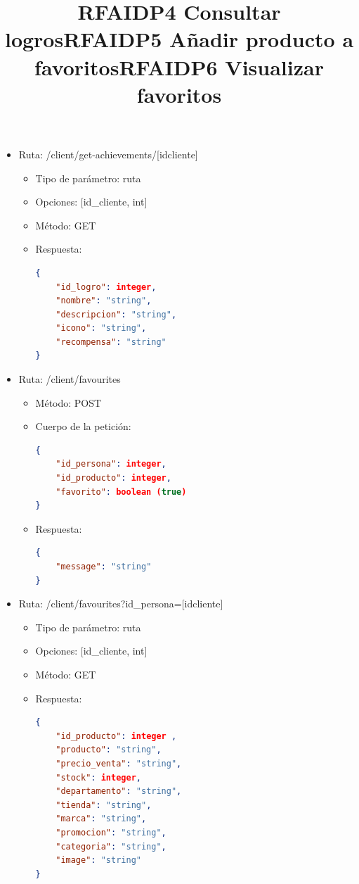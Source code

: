 \title{\textbf{RFAIDP4 Consultar logros}}
\begin{itemize}
\item Ruta: /client/get-achievements/[idcliente]
\begin{itemize}
\item Tipo de parámetro: ruta
\item Opciones: [id\_cliente, int]
\item Método: GET
\item Respuesta:
\begin{lstlisting}[language=json,firstnumber=1]
{
	"id_logro": integer, 
	"nombre": "string",
	"descripcion": "string",
	"icono": "string",
	"recompensa": "string"
}
\end{lstlisting}
\end{itemize}
\end{itemize}
\title{\textbf{RFAIDP5 Añadir producto a favoritos}}
\begin{itemize}
\item Ruta: /client/favourites
\begin{itemize}
\item Método: POST
\item Cuerpo de la petición:
\begin{lstlisting}[language=json,firstnumber=1]
{
	"id_persona": integer, 
	"id_producto": integer,
	"favorito": boolean (true)
}
\end{lstlisting}
\item Respuesta: 
\begin{lstlisting}[language=json,firstnumber=1]
{
    "message": "string"
}
\end{lstlisting}
\end{itemize}
\end{itemize}
\title{\textbf{RFAIDP6 Visualizar favoritos}}
\begin{itemize}
\item Ruta: /client/favourites?id\_persona=[idcliente]
\begin{itemize}
\item Tipo de parámetro: ruta
\item Opciones: [id\_cliente, int]
\item Método: GET
\item Respuesta:
\begin{lstlisting}[language=json,firstnumber=1]
{
	"id_producto": integer ,
	"producto": "string",
	"precio_venta": "string",
	"stock": integer,
	"departamento": "string",
	"tienda": "string",
	"marca": "string", 
	"promocion": "string",
	"categoria": "string",
	"image": "string"
}
\end{lstlisting}
\end{itemize}
\end{itemize}

